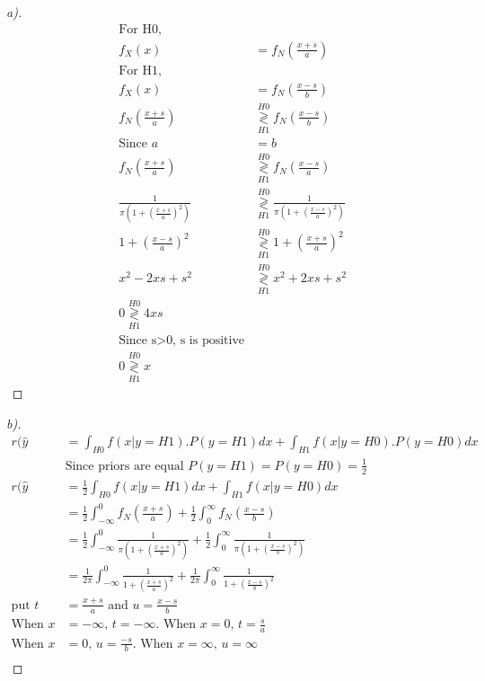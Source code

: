 \documentclass[12pt]{article}
\newcommand\gldec[2]{
\underset{#1}{\overset{#2}{\gtrless}}
}
\newenvironment{theorem}[2][Theorem]{\begin{trivlist}
\item[\hskip \labelsep {\bfseries #1}\hskip \labelsep {\bfseries #2.}]}{\end{trivlist}}
\begin{document}
\begin{theorem}[Ans]{3}
\begin{proof}[a)]
\begin{align*}
\text{For H0,}\\
f_{X}(x) &= f_{N}(\frac{x+s}{a})\\
\text{For H1,}\\
f_{X}(x) &= f_{N}(\frac{x-s}{b})\\
f_{N}(\frac{x+s}{a}) & \gldec{H1}{H0} f_{N}(\frac{x-s}{b})\\
\text{Since }a&=b\\
f_{N}(\frac{x+s}{a}) & \gldec{H1}{H0} f_{N}(\frac{x-s}{a})\\
\frac{1}{\pi (1+(\frac{x+s}{a})^{2})} & \gldec{H1}{H0} \frac{1}{\pi (1+(\frac{x-s}{a})^{2})}\\
1+(\frac{x-s}{a})^2 & \gldec{H1}{H0} 1 + (\frac{x+s}{a})^{2}\\
x^{2}-2xs+s^{2} & \gldec{H1}{H0} x^{2}+2xs+s^{2} \\
0 \gldec{H1}{H0} 4xs\\
\text{Since s$>$0, s is positive}\\
0 \gldec{H1}{H0} x
\end{align*}
\end{proof}
\pagebreak
\begin{proof}[b)] 
\begin{align*}
r(\hat{y} &= \int_{H0}f(x|y=H1).P(y=H1)dx + \int_{H1}f(x|y=H0).P(y=H0)dx\\
&\text{Since priors are equal }P(y=H1) = P(y=H0) =\frac{1}{2}\\
r(\hat{y} &= \frac{1}{2}\int_{H0}f(x|y=H1)dx+ \int_{H1}f(x|y=H0)dx\\
&= \frac{1}{2} \int_{-\infty}^{0}f_{N}(\frac{x+s}{a}) + \frac{1}{2} \int_{0}^{\infty}f_{N}(\frac{x-s}{b})\\
&= \frac{1}{2}\int_{-\infty}^{0}\frac{1}{\pi (1+(\frac{x+s}{a})^{2})} +  \frac{1}{2}\int_{0}^{\infty}\frac{1}{\pi (1+(\frac{x-s}{b})^{2})}\\
&= \frac{1}{2\pi}\int_{-\infty}^{0}\frac{1}{1+(\frac{x+s}{a})^{2}} + \frac{1}{2\pi}\int_{0}^{\infty}\frac{1}{1+(\frac{x-s}{b})^{2}}\\
\text{put }t &= \frac{x+s}{a} \text{ and }u = \frac{x-s}{b}  \\
\text{When }x&=-\infty\text{,  } t = -\infty\text{. When } x=0 \text{,  }t=\frac{s}{a}\\
\text{When }x&=0\text{,  } u = \frac{-s}{b}\text{. When } x=\infty \text{,  }u=\infty\\

\end{align*}
\end{proof}
\end{theorem}
\end{document}
